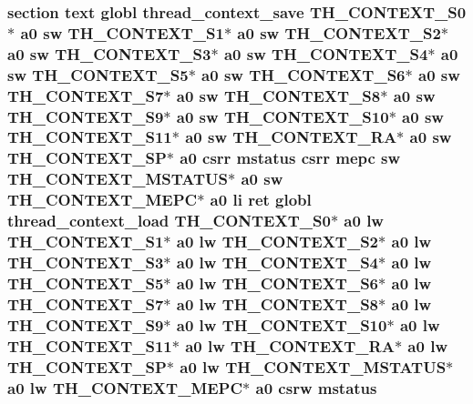 \hypertarget{riscv_2threada_8S_af78ed195559527aba9680933e9ce7a92}{
\subsubsection[{mstatus}]{\setlength{\rightskip}{0pt plus 5cm}section text globl {\bf thread\-\_\-context\-\_\-save} {\bf T\-H\-\_\-\-C\-O\-N\-T\-E\-X\-T\-\_\-\-S0}$\ast$ {\bf a0} {\bf sw} {\bf T\-H\-\_\-\-C\-O\-N\-T\-E\-X\-T\-\_\-\-S1}$\ast$ {\bf a0} {\bf sw} {\bf T\-H\-\_\-\-C\-O\-N\-T\-E\-X\-T\-\_\-\-S2}$\ast$ {\bf a0} {\bf sw} {\bf T\-H\-\_\-\-C\-O\-N\-T\-E\-X\-T\-\_\-\-S3}$\ast$ {\bf a0} {\bf sw} {\bf T\-H\-\_\-\-C\-O\-N\-T\-E\-X\-T\-\_\-\-S4}$\ast$ {\bf a0} {\bf sw} {\bf T\-H\-\_\-\-C\-O\-N\-T\-E\-X\-T\-\_\-\-S5}$\ast$ {\bf a0} {\bf sw} {\bf T\-H\-\_\-\-C\-O\-N\-T\-E\-X\-T\-\_\-\-S6}$\ast$ {\bf a0} {\bf sw} {\bf T\-H\-\_\-\-C\-O\-N\-T\-E\-X\-T\-\_\-\-S7}$\ast$ {\bf a0} {\bf sw} {\bf T\-H\-\_\-\-C\-O\-N\-T\-E\-X\-T\-\_\-\-S8}$\ast$ {\bf a0} {\bf sw} {\bf T\-H\-\_\-\-C\-O\-N\-T\-E\-X\-T\-\_\-\-S9}$\ast$ {\bf a0} {\bf sw} {\bf T\-H\-\_\-\-C\-O\-N\-T\-E\-X\-T\-\_\-\-S10}$\ast$ {\bf a0} {\bf sw} {\bf T\-H\-\_\-\-C\-O\-N\-T\-E\-X\-T\-\_\-\-S11}$\ast$ {\bf a0} {\bf sw} {\bf T\-H\-\_\-\-C\-O\-N\-T\-E\-X\-T\-\_\-\-R\-A}$\ast$ {\bf a0} {\bf sw} {\bf T\-H\-\_\-\-C\-O\-N\-T\-E\-X\-T\-\_\-\-S\-P}$\ast$ {\bf a0} csrr mstatus csrr {\bf mepc} {\bf sw} {\bf T\-H\-\_\-\-C\-O\-N\-T\-E\-X\-T\-\_\-\-M\-S\-T\-A\-T\-U\-S}$\ast$ {\bf a0} {\bf sw} {\bf T\-H\-\_\-\-C\-O\-N\-T\-E\-X\-T\-\_\-\-M\-E\-P\-C}$\ast$ {\bf a0} {\bf li} ret globl {\bf thread\-\_\-context\-\_\-load} {\bf T\-H\-\_\-\-C\-O\-N\-T\-E\-X\-T\-\_\-\-S0}$\ast$ {\bf a0} {\bf lw} {\bf T\-H\-\_\-\-C\-O\-N\-T\-E\-X\-T\-\_\-\-S1}$\ast$ {\bf a0} {\bf lw} {\bf T\-H\-\_\-\-C\-O\-N\-T\-E\-X\-T\-\_\-\-S2}$\ast$ {\bf a0} {\bf lw} {\bf T\-H\-\_\-\-C\-O\-N\-T\-E\-X\-T\-\_\-\-S3}$\ast$ {\bf a0} {\bf lw} {\bf T\-H\-\_\-\-C\-O\-N\-T\-E\-X\-T\-\_\-\-S4}$\ast$ {\bf a0} {\bf lw} {\bf T\-H\-\_\-\-C\-O\-N\-T\-E\-X\-T\-\_\-\-S5}$\ast$ {\bf a0} {\bf lw} {\bf T\-H\-\_\-\-C\-O\-N\-T\-E\-X\-T\-\_\-\-S6}$\ast$ {\bf a0} {\bf lw} {\bf T\-H\-\_\-\-C\-O\-N\-T\-E\-X\-T\-\_\-\-S7}$\ast$ {\bf a0} {\bf lw} {\bf T\-H\-\_\-\-C\-O\-N\-T\-E\-X\-T\-\_\-\-S8}$\ast$ {\bf a0} {\bf lw} {\bf T\-H\-\_\-\-C\-O\-N\-T\-E\-X\-T\-\_\-\-S9}$\ast$ {\bf a0} {\bf lw} {\bf T\-H\-\_\-\-C\-O\-N\-T\-E\-X\-T\-\_\-\-S10}$\ast$ {\bf a0} {\bf lw} {\bf T\-H\-\_\-\-C\-O\-N\-T\-E\-X\-T\-\_\-\-S11}$\ast$ {\bf a0} {\bf lw} {\bf T\-H\-\_\-\-C\-O\-N\-T\-E\-X\-T\-\_\-\-R\-A}$\ast$ {\bf a0} {\bf lw} {\bf T\-H\-\_\-\-C\-O\-N\-T\-E\-X\-T\-\_\-\-S\-P}$\ast$ {\bf a0} {\bf lw} {\bf T\-H\-\_\-\-C\-O\-N\-T\-E\-X\-T\-\_\-\-M\-S\-T\-A\-T\-U\-S}$\ast$ {\bf a0} {\bf lw} {\bf T\-H\-\_\-\-C\-O\-N\-T\-E\-X\-T\-\_\-\-M\-E\-P\-C}$\ast$ {\bf a0} csrw mstatus}}\label{riscv_2threada_8S_af78ed195559527aba9680933e9ce7a92}

